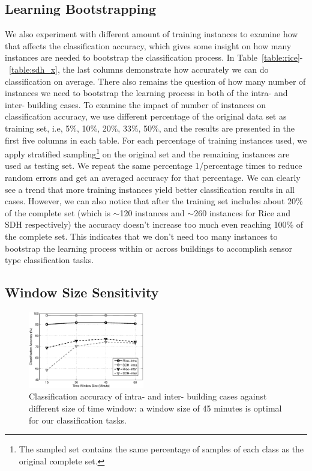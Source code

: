 \subsection{Learning Bootstrapping}
We also experiment with different amount of training instances to examine how that affects the classification accuracy, which gives some insight on how many instances are needed 
to bootstrap the classification process. In Table~\ref{table:rice}-~\ref{table:sdh_x}, %
the last columns demonstrate how accurately we can do 
classification on average. There also remains the question of how many number of instances we need to bootstrap the learning process in both of the intra- and inter- building cases. 
To examine the impact of number of instances on classification accuracy, we use different percentage of the original data set as training set, i.e, 5\%, 10\%, 20\%, 33\%, 50\%, and the 
results are presented in the first five columns in each table. For each percentage of training instances used, we apply stratified sampling\footnote{The sampled set contains the same 
percentage of samples of each class as the original complete set.} on the original set and the remaining instances are used as testing set. We repeat the same percentage 1/percentage times 
to reduce random errors and get an averaged accuracy for that percentage. We can clearly see a trend that more training instances yield better classification results in all cases. 
However, we can also notice that after the training set includes about 20\% of the complete set (which is $\sim$120 instances and $\sim$260 instances for Rice and SDH respectively) the 
accuracy doesn't increase too much even reaching 100\% of the complete set. This indicates that we don't need too many instances to bootstrap the learning process within or across buildings 
to accomplish sensor type classification tasks.

\subsection{Window Size Sensitivity}
\begin{figure}[ht!]
\centering
	\includegraphics[width=0.45\textwidth]{./fig/window.eps}
\caption{Classification accuracy of intra- and inter- building cases against different size of time window: a window size of 45 minutes is optimal for our classification tasks.}
\label{fig:window}
\end{figure}

